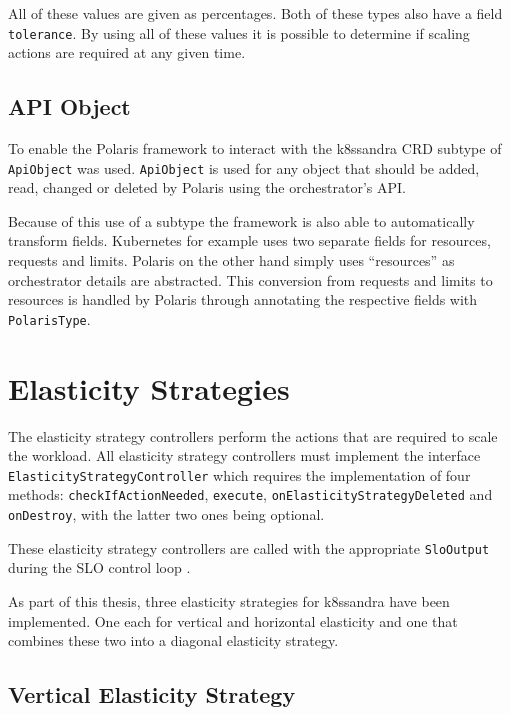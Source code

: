 All of these values are given as percentages. Both of these types also have a field \texttt{tolerance}. By using all of these values it is possible to determine if scaling actions are required at any given time. 

\subsection{API Object}

To enable the Polaris framework to interact with the k8ssandra CRD subtype of \texttt{ApiObject} was used. \texttt{ApiObject} is used for any object that should be added, read, changed or deleted by Polaris using the orchestrator's API.

Because of this use of a subtype the framework is also able to automatically transform fields. Kubernetes for example uses two separate fields for resources, requests and limits. Polaris on the other hand simply uses ``resources'' as orchestrator details are abstracted. This conversion from requests and limits to resources is handled by Polaris through annotating the respective fields with \texttt{PolarisType}.

\section{Elasticity Strategies}


The elasticity strategy controllers perform the actions that are required to scale the workload. All elasticity strategy controllers must implement the interface \texttt{Elasticity\-Strategy\-Controller} which requires the implementation of four methods: \texttt{check\-If\-Action\-Needed}, \texttt{execute}, \texttt{on\-Elasticity\-Strategy\-Deleted} and \texttt{on\-Destroy}, with the latter two ones being optional.

These elasticity strategy controllers are called with the appropriate \texttt{SloOutput} during the SLO control loop \cite{pusztaiNovelMiddlewareEfficiently2021a}.

As part of this thesis, three elasticity strategies for k8ssandra have been implemented. One each for vertical and horizontal elasticity and one that combines these two into a diagonal elasticity strategy.

\subsection{Vertical Elasticity Strategy}
\label{sec:vertical-elasticity}

